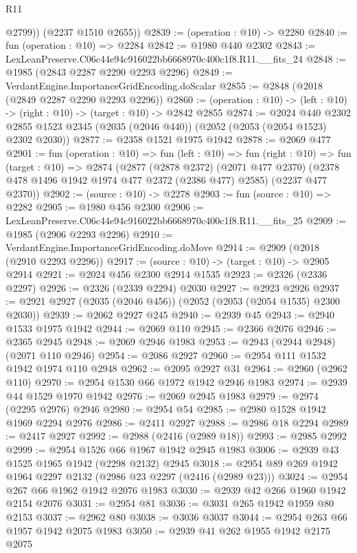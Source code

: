 \begin{lexlean}{R11}
\begin{coremodule}
          @2799))
      (@2237 @1510 @2655))
@2839 := (operation : @10) -> @2280
@2840 := fun (operation : @10) => @2284
@2842 := @1980 @440 @2302
@2843 := LexLeanPreserve.C06c44e94c916022bb6668970c400c1f8.R11.__fits_24
@2848 := @1985 (@2843 @2287 @2290 @2293 @2296)
@2849 := VerdantEngine.ImportanceGridEncoding.doScalar
@2855 := @2848 (@2018 (@2849 @2287 @2290 @2293 @2296))
@2860 := (operation : @10) -> (left : @10) -> (right : @10) -> (target : @10) -> @2842 @2855
@2874 := @2024
    @440
    @2302
    @2855
    @1523
    @2345
    (@2035 (@2046 @440))
    (@2052 (@2053 (@2054 @1523) @2302 @2030))
@2877 := @2358 @1521 @1975 @1942
@2878 := @2069 @477
@2901 := fun (operation : @10) =>
  fun (left : @10) =>
  fun (right : @10) =>
  fun (target : @10) =>
  @2874
    (@2877
      (@2878 @2372)
      (@2071 @477 @2370)
      (@2378 @478 @1496 @1942 @1974 @477 @2372 (@2386 @477) @2585)
      (@2237 @477 @2370))
@2902 := (source : @10) -> @2278
@2903 := fun (source : @10) => @2282
@2905 := @1980 @456 @2300
@2906 := LexLeanPreserve.C06c44e94c916022bb6668970c400c1f8.R11.__fits_25
@2909 := @1985 (@2906 @2293 @2296)
@2910 := VerdantEngine.ImportanceGridEncoding.doMove
@2914 := @2909 (@2018 (@2910 @2293 @2296))
@2917 := (source : @10) -> (target : @10) -> @2905 @2914
@2921 := @2024 @456 @2300 @2914 @1535
@2923 := @2326 (@2336 @2297)
@2926 := @2326 (@2339 @2294) @2030
@2927 := @2923 @2926
@2937 := @2921 @2927 (@2035 (@2046 @456)) (@2052 (@2053 (@2054 @1535) @2300 @2030))
@2939 := @2062 @2927 @245
@2940 := @2939 @45
@2943 := @2940 @1533 @1975 @1942
@2944 := @2069 @110
@2945 := @2366 @2076
@2946 := @2365 @2945
@2948 := @2069 @2946 @1983
@2953 := @2943 (@2944 @2948) (@2071 @110 @2946)
@2954 := @2086 @2927
@2960 := @2954 @111 @1532 @1942 @1974 @110 @2948
@2962 := @2095 @2927 @31
@2964 := @2960 (@2962 @110)
@2970 := @2954 @1530 @66 @1972 @1942 @2946 @1983
@2974 := @2939 @44 @1529 @1970 @1942
@2976 := @2069 @2945 @1983
@2979 := @2974 (@2295 @2976) @2946
@2980 := @2954 @54
@2985 := @2980 @1528 @1942 @1969 @2294 @2976
@2986 := @2411 @2927
@2988 := @2986 @18 @2294
@2989 := @2417 @2927
@2992 := @2988 (@2416 (@2989 @18))
@2993 := @2985 @2992
@2999 := @2954 @1526 @66 @1967 @1942 @2945 @1983
@3006 := @2939 @43 @1525 @1965 @1942 (@2298 @2132) @2945
@3018 := @2954 @89 @269 @1942 @1964 @2297 @2132 (@2986 @23 @2297 (@2416 (@2989 @23)))
@3024 := @2954 @267 @66 @1962 @1942 @2076 @1983
@3030 := @2939 @42 @266 @1960 @1942 @2154 @2076
@3031 := @2954 @81
@3036 := @3031 @265 @1942 @1959 @80 @2153
@3037 := @2962 @80
@3038 := @3036 @3037
@3044 := @2954 @263 @66 @1957 @1942 @2075 @1983
@3050 := @2939 @41 @262 @1955 @1942 @2175 @2075

\end{coremodule}
\end{lexlean}
